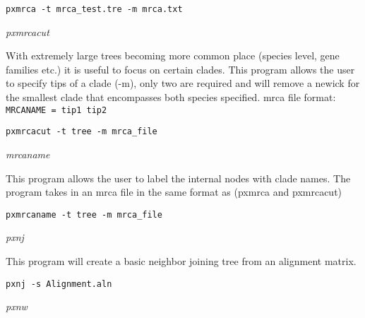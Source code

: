 \documentclass[12pt,letterpaper]{article}
\renewcommand{\subsection}[1]{%
\bigskip
\begin{center}
\begin{large}
\normalfont\itshape #1
\end{large}
\end{center}}
\begin{document}
\begin{flushleft}
\begin{verbatim}
pxmrca -t mrca_test.tre -m mrca.txt
\end{verbatim}
\end{flushleft}


\subsection{pxmrcacut}

With extremely large trees becoming more common place (species level, gene families etc.) it is useful to focus on certain clades. This program allows the user to specify tips of a clade (-m), only two are required and will remove a newick for the smallest clade that encompasses both species specified. mrca file format:
\texttt{MRCANAME = tip1 tip2}

\begin{flushleft}
\begin{verbatim}
pxmrcacut -t tree -m mrca_file
\end{verbatim}
\end{flushleft}

\subsection{mrcaname}

This program allows the user to label the internal nodes with clade names. The program takes in an mrca file in the same format as (pxmrca and pxmrcacut)

\begin{flushleft}
\begin{verbatim}
pxmrcaname -t tree -m mrca_file
\end{verbatim}
\end{flushleft}

\subsection{pxnj}

This program will create a basic neighbor joining tree from an alignment matrix.

\begin{flushleft}
\begin{verbatim}
pxnj -s Alignment.aln
\end{verbatim}
\end{flushleft}

\subsection{pxnw}
\end{document}
